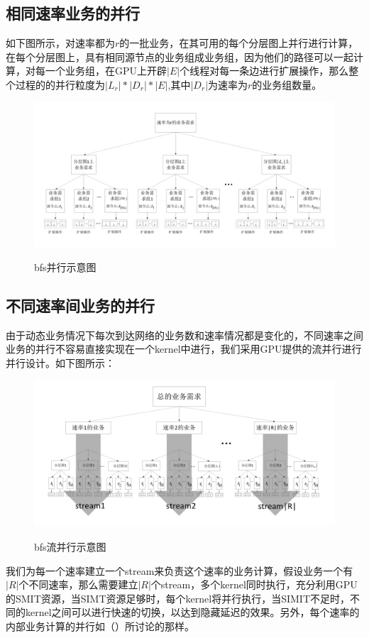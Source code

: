 \subsection {相同速率业务的并行}
  如下图所示，对速率都为$r$的一批业务，在其可用的每个分层图上并行进行计算，在每个分层图上，具有相同源节点的业务组成业务组，因为他们的路径可以一起计算，对每一个业务组，在GPU上开辟$|E|$个线程对每一条边进行扩展操作，那么整个过程的的并行粒度为$|L_r|*|D_r|*|E|$,其中$|D_r|$为速率为$r$的业务组数量。
 \begin{figure}
\setlength{\belowcaptionskip}{-0.5cm}
  \begin{center}
    {\includegraphics[width=1 \textwidth]{figures/bfs.pdf}}
    \end{center}
  \caption{{\footnotesize{bfs并行示意图}}}
  \label{bfs}
\end{figure}
\subsection{不同速率间业务的并行}
  由于动态业务情况下每次到达网络的业务数和速率情况都是变化的，不同速率之间业务的并行不容易直接实现在一个kernel中进行，我们采用GPU提供的流并行进行并行设计。如下图所示：
 \begin{figure}
\setlength{\belowcaptionskip}{-0.5cm}
  \begin{center}
    {\includegraphics[width=1 \textwidth]{figures/hbfs.pdf}}
    \end{center}
  \caption{{\footnotesize{bfs流并行示意图}}}
  \label{bfssteam}
\end{figure}
 我们为每一个速率建立一个stream来负责这个速率的业务计算，假设业务一个有$|R|$个不同速率，那么需要建立$|R|$个stream，多个kernel同时执行，充分利用GPU的SMIT资源，当SIMT资源足够时，每个kernel将并行执行，当SIMIT不足时，不同的kernel之间可以进行快速的切换，以达到隐藏延迟的效果。另外，每个速率的内部业务计算的并行如（）所讨论的那样。
